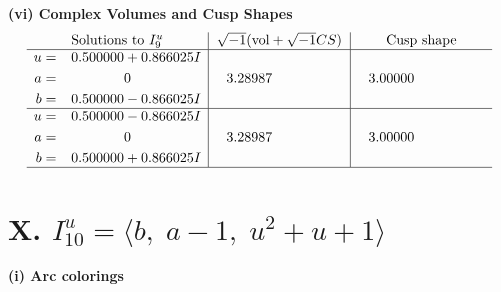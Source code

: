 \documentclass[1p]{elsarticle_modified}
\theoremstyle{definition}
\newcommand{\I}{\sqrt{-1}}
\begin{document}
\newpage\flushleft \textbf{(vi) Complex Volumes and Cusp Shapes}
$$\begin{array}{c|c|c}  
\text{Solutions to }I^u_{9}& \I (\text{vol} + \sqrt{-1}CS) & \text{Cusp shape}\\
 \hline 
\begin{aligned}
u &= \phantom{-}0.500000 + 0.866025 I \\
a &= \phantom{-0.000000 } 0 \\
b &= \phantom{-}0.500000 - 0.866025 I\end{aligned}
 & \phantom{-}3.28987\phantom{ +0.000000I} & \phantom{-}3.00000\phantom{ +0.000000I} \\ \hline\begin{aligned}
u &= \phantom{-}0.500000 - 0.866025 I \\
a &= \phantom{-0.000000 } 0 \\
b &= \phantom{-}0.500000 + 0.866025 I\end{aligned}
 & \phantom{-}3.28987\phantom{ +0.000000I} & \phantom{-}3.00000\phantom{ +0.000000I}\\
 \hline 
 \end{array}$$\newpage\newpage\renewcommand{\arraystretch}{1}
\centering \section*{X. $I^u_{10}= \langle b,\;a-1,\;u^2+u+1 \rangle$}
\flushleft \textbf{(i) Arc colorings}\\
\end{document}
